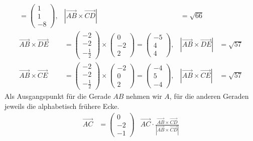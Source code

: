 \begin{loesung}
\begin{align*}
=
\begin{pmatrix}
1\\1\\-8
\end{pmatrix},
&
|\overrightarrow{AB}\times\overrightarrow{CD}|
&=
\sqrt{66}
\\
\overrightarrow{AB}\times\overrightarrow{DE}
&=
\begin{pmatrix} -2\\-2\\-\frac12 \end{pmatrix}
\times
\begin{pmatrix} 0\\-2\\2\end{pmatrix}
=
\begin{pmatrix} -5\\4\\4\end{pmatrix},
&
|\overrightarrow{AB}\times\overrightarrow{DE}|
&=
\sqrt{57}
\\
\overrightarrow{AB}\times\overrightarrow{CE}
&=
\begin{pmatrix} -2\\-2\\-\frac12 \end{pmatrix}
\times
\begin{pmatrix} -2\\0\\2\end{pmatrix}
=
\begin{pmatrix} -4\\5\\-4\end{pmatrix},
&
|\overrightarrow{AB}\times\overrightarrow{CE}|
&=
\sqrt{57}
\end{align*}
Als Ausgangspunkt für die Gerade $AB$ nehmen wir $A$, für
die anderen Geraden jeweils die alphabetisch frühere Ecke.
\begin{align*}
\overrightarrow{AC}
&=
\begin{pmatrix}0\\-2\\-1\end{pmatrix}
&
\overrightarrow{AC}
\cdot
\frac{\overrightarrow{AB}\times\overrightarrow{CD}}{|\overrightarrow{AB}\times\overrightarrow{CD}|}

\end{align*}
\end{loesung}
